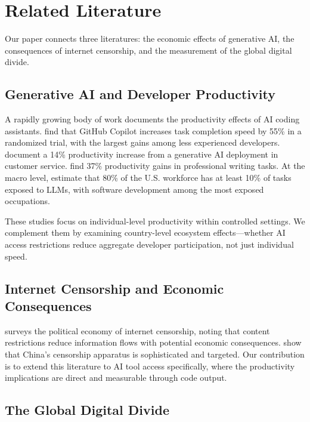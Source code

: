 \documentclass[12pt]{article}
\begin{document}
\section{Related Literature}

Our paper connects three literatures: the economic effects of generative AI, the consequences of internet censorship, and the measurement of the global digital divide.

\subsection{Generative AI and Developer Productivity}

A rapidly growing body of work documents the productivity effects of AI coding assistants. \citet{peng2023impact} find that GitHub Copilot increases task completion speed by 55\% in a randomized trial, with the largest gains among less experienced developers. \citet{brynjolfsson2023generative} document a 14\% productivity increase from a generative AI deployment in customer service. \citet{noy2023experimental} find 37\% productivity gains in professional writing tasks. At the macro level, \citet{eloundou2023gpts} estimate that 80\% of the U.S. workforce has at least 10\% of tasks exposed to LLMs, with software development among the most exposed occupations.

These studies focus on individual-level productivity within controlled settings. We complement them by examining country-level ecosystem effects---whether AI access restrictions reduce aggregate developer participation, not just individual speed.

\subsection{Internet Censorship and Economic Consequences}

\citet{roberts2018internet} surveys the political economy of internet censorship, noting that content restrictions reduce information flows with potential economic consequences. \citet{king2013censorship} show that China's censorship apparatus is sophisticated and targeted. Our contribution is to extend this literature to AI tool access specifically, where the productivity implications are direct and measurable through code output.

\subsection{The Global Digital Divide}
\end{document}
